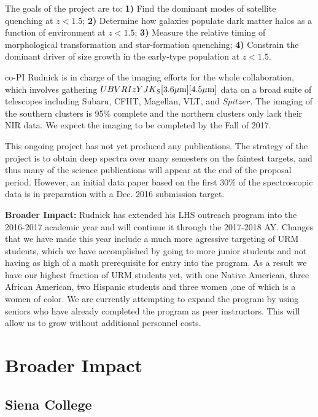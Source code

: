 \documentclass[11pt, preprint]{aastex}
\begin{document}
{The goals of the project are to: \textbf{1)} Find the dominant modes
of satellite quenching at $z<1.5$; \textbf{2)} Determine how galaxies
populate dark matter halos as a function of environment at $z<1.5$;
\textbf{3)} Measure the relative timing of morphological
transformation and star-formation quenching; \textbf{4)} Constrain the
dominant driver of size growth in the early-type population at
\boldmath$z<1.5$.  

co-PI Rudnick is in charge of the imaging efforts for the whole
collaboration, which involves gathering
$UBVRIzYJK_S[3.6\mbox{$\mu$m}][4.5\mbox{$\mu$m}]$ data on a broad suite of
telescopes including Subaru, CFHT, Magellan, VLT, and $Spitzer$.  The
imaging of the southern clusters is 95\% complete and the northern
clusters only lack their NIR data.  We expect the imaging to be
completed by the Fall of 2017.

This ongoing project has not yet produced any publications.  The strategy of the project is to obtain deep spectra over many
semesters on the faintest targets, and thus many of the science
publications will appear at the end of the proposal period.  However,
an initial data paper based on the first 30\% of the spectroscopic
data is in preparation with a Dec. 2016 submission target.

\textbf{Broader Impact:} Rudnick has extended his LHS outreach program
into the 2016-2017 academic year and will continue it through the
2017-2018 AY.  Changes that we have made this year include a much more
agressive targeting of URM students, which we have accomplished by
going to more junior students and not having as high of a math
prerequisite for entry into the program.  As a result we have our
highest fraction of URM students yet, with one Native American, three
African American, two Hispanic students and three women ,one of which
is a women of color.  We are currently attempting to expand the
program by using seniors who have already completed the program as
peer instructors.  This will allow us to grow without additional
personnel costs.

\vspace*{-.7cm}
\section{Broader Impact}

\vspace*{-.4cm}
\subsection{Siena College}
\vspace*{-.4cm}

}
\end{document}

